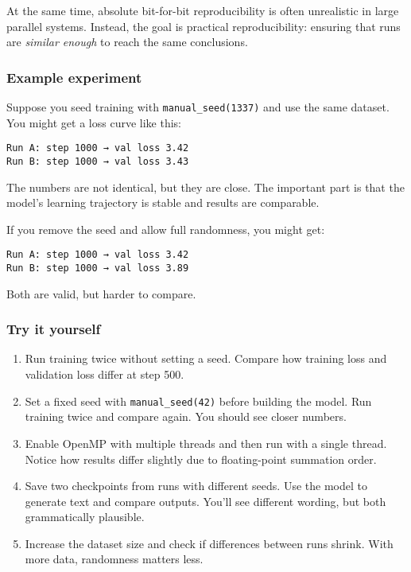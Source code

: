 \documentclass[
  letterpaper,
  DIV=11,
  numbers=noendperiod]{scrreprt}
\providecommand{\tightlist}{%
  \setlength{\itemsep}{0pt}\setlength{\parskip}{0pt}}
\begin{document}
At the same time, absolute bit-for-bit reproducibility is often
unrealistic in large parallel systems. Instead, the goal is practical
reproducibility: ensuring that runs are \emph{similar enough} to reach
the same conclusions.

\subsubsection{Example experiment}\label{example-experiment}

Suppose you seed training with \texttt{manual\_seed(1337)} and use the
same dataset. You might get a loss curve like this:

\begin{verbatim}
Run A: step 1000 → val loss 3.42  
Run B: step 1000 → val loss 3.43  
\end{verbatim}

The numbers are not identical, but they are close. The important part is
that the model's learning trajectory is stable and results are
comparable.

If you remove the seed and allow full randomness, you might get:

\begin{verbatim}
Run A: step 1000 → val loss 3.42  
Run B: step 1000 → val loss 3.89  
\end{verbatim}

Both are valid, but harder to compare.

\subsubsection{Try it yourself}\label{try-it-yourself-36}

\begin{enumerate}
\def\labelenumi{\arabic{enumi}.}
\tightlist
\item
  Run training twice without setting a seed. Compare how training loss
  and validation loss differ at step 500.
\item
  Set a fixed seed with \texttt{manual\_seed(42)} before building the
  model. Run training twice and compare again. You should see closer
  numbers.
\item
  Enable OpenMP with multiple threads and then run with a single thread.
  Notice how results differ slightly due to floating-point summation
  order.
\item
  Save two checkpoints from runs with different seeds. Use the model to
  generate text and compare outputs. You'll see different wording, but
  both grammatically plausible.
\item
  Increase the dataset size and check if differences between runs
  shrink. With more data, randomness matters less.
\end{enumerate}
\end{document}
